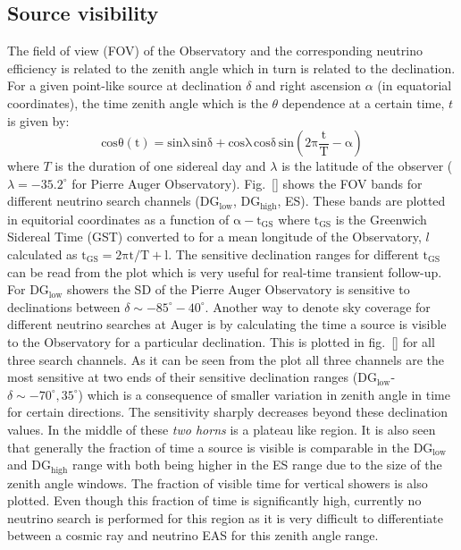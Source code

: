 \subsection{Source visibility}
\label{subsec:psource_coverage}
The field of view (FOV) of the Observatory and the corresponding neutrino efficiency is related to the zenith angle which in turn is related to the declination. For a given point-like source at declination $\delta$ and right ascension $\alpha$ (in equatorial coordinates), the time zenith angle which is the $\theta$ dependence at a certain time, $t$ is given by:
\begin{equation}
  \label{eq:zenith_angle_time}
  \mathrm{cos \theta(t) = sin \lambda \,sin \delta+ cos \lambda \, cos \delta \,sin (2\pi \frac{t}{T} - \alpha)}
\end{equation} 
where $T$ is the duration of one sidereal day and $\lambda$ is the latitude of the observer ($\lambda = -35.2^{\circ}$ for Pierre Auger Observatory). 
Fig.~\ref{} shows the FOV bands for different neutrino search channels (DG$\mathrm{_{low}}$, DG$\mathrm{_{high}}$, ES). These bands are plotted in equitorial coordinates as a function of $\mathrm{\alpha - t _{GS}}$ where $\mathrm{t_{GS}}$ is the Greenwich Sidereal Time (GST) converted to for a mean longitude of the Observatory, $l$ calculated as $\mathrm{t_{GS}= 2\pi t/T + l}$. The sensitive declination ranges for different $\mathrm{t_{GS}}$ can be read from the plot which is very useful for real-time transient follow-up. For DG$\mathrm{_{low}}$ showers the SD of the Pierre Auger Observatory is sensitive to declinations between $\delta \sim -85^{\circ} - 40^{\circ}$. Another way to denote sky coverage for different neutrino searches at Auger is by calculating the time a source is visible to the Observatory for a particular declination. This is plotted in fig.~\ref{} for all three search channels. As it can be seen from the plot all three channels are the most sensitive at two ends of their sensitive declination ranges (DG$\mathrm{_{low}}$-$\delta \sim -70^{\circ}, 35^{\circ}$) which is a consequence of smaller variation in zenith angle in time for certain directions. The sensitivity sharply decreases beyond these declination values. In the middle of these \textit{two horns} is a plateau like region. It is also seen that generally the fraction of time a source is visible is comparable in the DG$\mathrm{_{low}}$ and DG$\mathrm{_{high}}$ range with both being higher in the ES range due to the size of the zenith angle windows. The fraction of visible time for vertical showers is also plotted. Even though this fraction of time is significantly high, currently no neutrino search is performed for this region as it is very difficult to differentiate between a cosmic ray and neutrino EAS for this zenith angle range.

